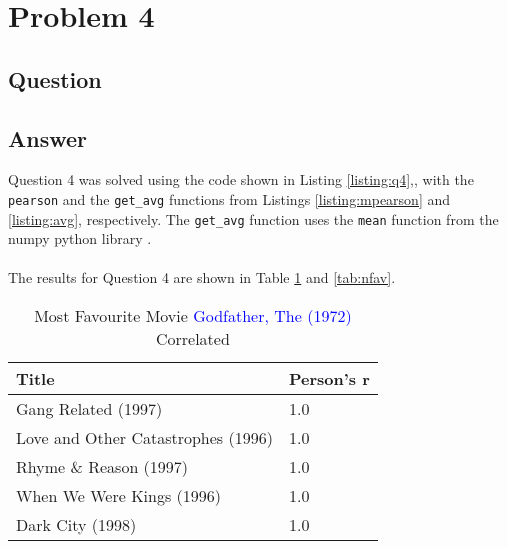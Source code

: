\section{Problem 4}

\subsection{Question}
\vspace*{10pt}


\subsection{Answer}
\vspace{5mm}
Question 4 was solved using the code shown in Listing \ref{listing:q4},, with the {\tt pearson} and the {\tt get\_avg} functions from Listings \ref{listing:mpearson} and \ref{listing:avg}, respectively. The {\tt get\_avg} function uses the {\tt mean} function from the numpy python library \cite{py:numpy}.\\
\\
The results for Question 4 are shown in Table \ref{tab:fav} and \ref{tab:nfav}. \\
\vspace{5mm}






\begin{table}[h!]
\centering
\begin{tabular}{| l | l |}
\hline
Title & Person's r \\
\hline
Gang Related (1997) & 1.0 \\
Love and Other Catastrophes (1996) & 1.0 \\
Rhyme \& Reason (1997) & 1.0 \\
When We Were Kings (1996) & 1.0 \\
Dark City (1998) & 1.0 \\
\hline
\end{tabular}
\caption{Most Favourite Movie \textcolor{blue}{Godfather, The (1972)} Correlated}
\label{tab:fav}
\end{table}

